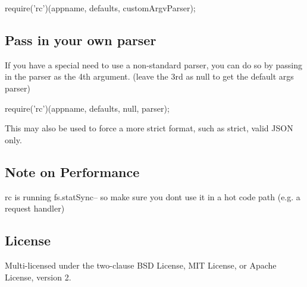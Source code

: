 \begin{DoxyCode}
require('rc')(appname, defaults, customArgvParser);
\end{DoxyCode}


\subsection*{Pass in your own parser}

If you have a special need to use a non-\/standard parser, you can do so by passing in the parser as the 4th argument. (leave the 3rd as null to get the default args parser)


\begin{DoxyCode}
require('rc')(appname, defaults, null, parser);
\end{DoxyCode}


This may also be used to force a more strict format, such as strict, valid J\+S\+ON only.

\subsection*{Note on Performance}

{\ttfamily rc} is running {\ttfamily fs.\+stat\+Sync}-- so make sure you don\textquotesingle{}t use it in a hot code path (e.\+g. a request handler)

\subsection*{License}

Multi-\/licensed under the two-\/clause B\+SD License, M\+IT License, or Apache License, version 2. 